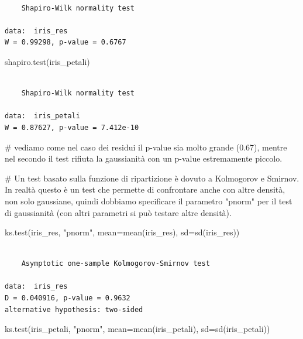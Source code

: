 \documentclass[
  italian,
  letterpaper,
]{book}
\newenvironment{Shaded}{\begin{snugshade}}{\end{snugshade}}
\newcommand{\AttributeTok}[1]{\textcolor[rgb]{0.40,0.45,0.13}{#1}}
\newcommand{\CommentTok}[1]{\textcolor[rgb]{0.37,0.37,0.37}{#1}}
\newcommand{\FunctionTok}[1]{\textcolor[rgb]{0.28,0.35,0.67}{#1}}
\newcommand{\NormalTok}[1]{\textcolor[rgb]{0.00,0.23,0.31}{#1}}
\newcommand{\StringTok}[1]{\textcolor[rgb]{0.13,0.47,0.30}{#1}}
\theoremstyle{definition}
\theoremstyle{remark}
\begin{document}
\begin{verbatim}

    Shapiro-Wilk normality test

data:  iris_res
W = 0.99298, p-value = 0.6767
\end{verbatim}

\begin{Shaded}
\begin{Highlighting}[]
\FunctionTok{shapiro.test}\NormalTok{(iris\_petali)}
\end{Highlighting}
\end{Shaded}

\begin{verbatim}

    Shapiro-Wilk normality test

data:  iris_petali
W = 0.87627, p-value = 7.412e-10
\end{verbatim}

\begin{Shaded}
\begin{Highlighting}[]
\CommentTok{\# vediamo come nel caso dei residui il p{-}value sia molto grande (0.67), mentre nel secondo il test rifiuta la gaussianità con un p{-}value estremamente piccolo.}

\CommentTok{\# Un test basato sulla funzione di ripartizione è dovuto a Kolmogorov e Smirnov. In realtà questo è un test che permette di confrontare anche con altre densità, non solo gaussiane, quindi dobbiamo specificare il parametro "pnorm"  per il test di gaussianità (con altri parametri si può testare altre densità).}

\FunctionTok{ks.test}\NormalTok{(iris\_res,  }\StringTok{"pnorm"}\NormalTok{, }\AttributeTok{mean=}\FunctionTok{mean}\NormalTok{(iris\_res), }\AttributeTok{sd=}\FunctionTok{sd}\NormalTok{(iris\_res))}
\end{Highlighting}
\end{Shaded}

\begin{verbatim}

    Asymptotic one-sample Kolmogorov-Smirnov test

data:  iris_res
D = 0.040916, p-value = 0.9632
alternative hypothesis: two-sided
\end{verbatim}

\begin{Shaded}
\begin{Highlighting}[]
\FunctionTok{ks.test}\NormalTok{(iris\_petali,  }\StringTok{"pnorm"}\NormalTok{, }\AttributeTok{mean=}\FunctionTok{mean}\NormalTok{(iris\_petali), }\AttributeTok{sd=}\FunctionTok{sd}\NormalTok{(iris\_petali))}
\end{Highlighting}
\end{Shaded}
\end{document}
